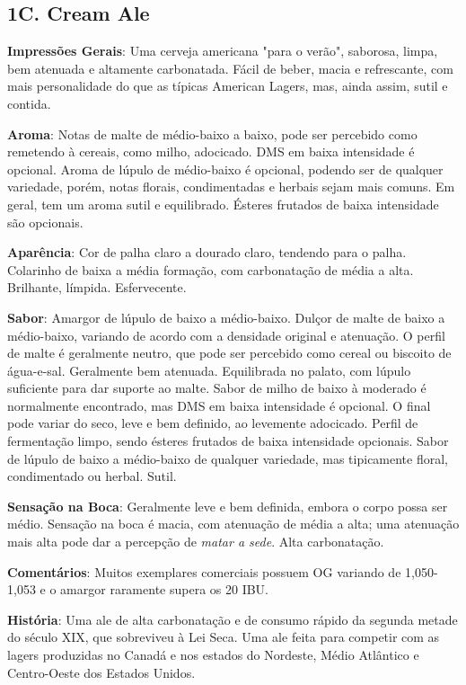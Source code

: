 \subsection*{1C. Cream Ale}
\textbf{Impressões Gerais}: Uma cerveja americana "para o verão", saborosa, limpa, bem atenuada e altamente carbonatada. Fácil de beber, macia e refrescante, com mais personalidade do que as típicas American Lagers, mas, ainda assim, sutil e contida.

\textbf{Aroma}: Notas de malte de médio-baixo a baixo, pode ser percebido como remetendo à cereais, como milho, adocicado. DMS em baixa intensidade é opcional. Aroma de lúpulo de médio-baixo é opcional, podendo ser de qualquer variedade, porém, notas florais, condimentadas e herbais sejam mais comuns. Em geral, tem um aroma sutil e equilibrado. Ésteres frutados de baixa intensidade são opcionais.

\textbf{Aparência}: Cor de palha claro a dourado claro, tendendo para o palha. Colarinho de baixa a média formação, com carbonatação de média a alta. Brilhante, límpida. Esfervecente.

\textbf{Sabor}: Amargor de lúpulo de baixo a médio-baixo. Dulçor de malte de baixo a médio-baixo, variando de acordo com a densidade original e atenuação. O perfil de malte é geralmente neutro, que pode ser percebido como cereal ou biscoito de água-e-sal. Geralmente bem atenuada. Equilibrada no palato, com lúpulo suficiente para dar suporte ao malte. Sabor de milho de baixo à moderado é normalmente encontrado, mas DMS em baixa intensidade é opcional. O final pode variar do seco, leve e bem definido, ao levemente adocicado. Perfil de fermentação limpo, sendo ésteres frutados de baixa intensidade opcionais. Sabor de lúpulo de baixo a médio-baixo de qualquer variedade, mas tipicamente floral, condimentado ou herbal. Sutil.

\textbf{Sensação na Boca}: Geralmente leve e bem definida, embora o corpo possa ser médio. Sensação na boca é macia, com atenuação de média a alta; uma atenuação mais alta pode dar a percepção de \textit{matar a sede}. Alta carbonatação.

\textbf{Comentários}: Muitos exemplares comerciais possuem OG variando de 1,050-1,053 e o amargor raramente supera os 20 IBU.

\textbf{História}: Uma ale de alta carbonatação e de consumo rápido da segunda metade do século XIX, que sobreviveu à Lei Seca. Uma ale feita para competir com as lagers produzidas no Canadá e nos estados do Nordeste, Médio Atlântico e Centro-Oeste dos Estados Unidos.


